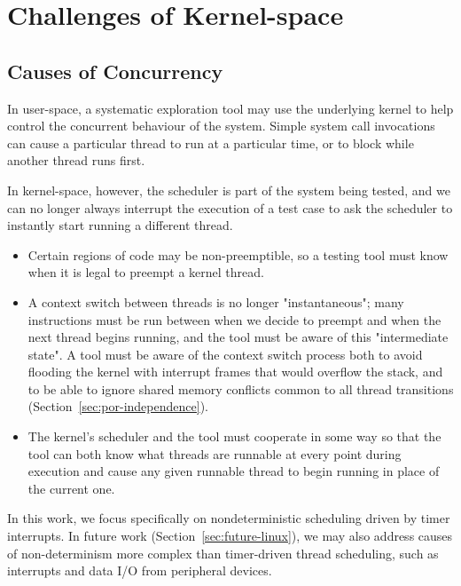 \section{Challenges of Kernel-space}

\subsection{Causes of Concurrency}

In user-space, a systematic exploration tool may use the underlying kernel to help control the concurrent behaviour of the system\cite{dbug-ssv}. Simple system call invocations can cause a particular thread to run at a particular time, or to block while another thread runs first.

In kernel-space, however, the scheduler is part of the system being tested, and we can no longer always interrupt the execution of a test case to ask the scheduler to instantly start running a different thread.
\begin{itemize}
	\item Certain regions of code may be non-preemptible, so a testing tool must know when it is legal to preempt a kernel thread.
	\item A context switch between threads is no longer "instantaneous"; many instructions must be run between when we decide to preempt and when the next thread begins running, and the tool must be aware of this "intermediate state". A tool must be aware of the context switch process both to avoid flooding the kernel with interrupt frames that would overflow the stack, and to be able to ignore shared memory conflicts common to all thread transitions (Section~\ref{sec:por-independence}).
	\item The kernel's scheduler and the tool must cooperate in some way so that the tool can both know what threads are runnable at every point during execution and cause any given runnable thread to begin running in place of the current one.
\end{itemize}

In this work, we focus specifically on nondeterministic scheduling driven by timer interrupts. In future work (Section~\ref{sec:future-linux}), we may also address causes of non-determinism more complex than timer-driven thread scheduling, such as interrupts and data I/O from peripheral devices.

